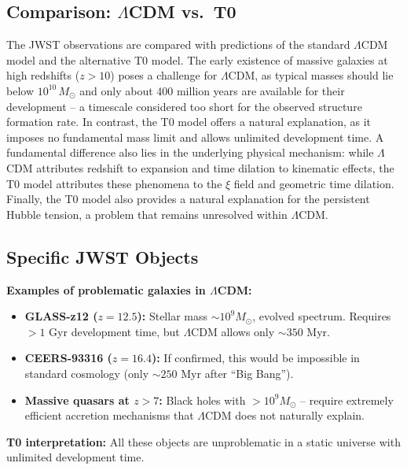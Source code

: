 \subsection{Comparison: $\Lambda$CDM vs.\ T0}

The JWST observations are compared with predictions of the standard 
$\Lambda$CDM model and the alternative T0 model. The early existence of 
massive galaxies at high redshifts ($z > 10$) poses a challenge for 
$\Lambda$CDM, as typical masses should lie below $10^{10}\,M_\odot$ and only 
about 400 million years are available for their development -- a timescale 
considered too short for the observed structure formation rate. In contrast, 
the T0 model offers a natural explanation, as it imposes no fundamental mass 
limit and allows unlimited development time. A fundamental difference also 
lies in the underlying physical mechanism: while $\Lambda$CDM attributes 
redshift to expansion and time dilation to kinematic effects, the T0 model 
attributes these phenomena to the $\xi$ field and geometric time dilation. 
Finally, the T0 model also provides a natural explanation for the persistent 
Hubble tension, a problem that remains unresolved within $\Lambda$CDM.

\subsection{Specific JWST Objects}

\textbf{Examples of problematic galaxies in $\Lambda$CDM:}

\begin{itemize}
\item \textbf{GLASS-z12 ($z=12.5$):} 
      Stellar mass $\sim 10^9 M_\odot$, evolved spectrum. 
      Requires $>1$ Gyr development time, but $\Lambda$CDM allows 
      only $\sim 350$ Myr.

\item \textbf{CEERS-93316 ($z=16.4$):} 
      If confirmed, this would be impossible in standard cosmology 
      (only $\sim 250$ Myr after ``Big Bang'').

\item \textbf{Massive quasars at $z>7$:} 
      Black holes with $>10^9 M_\odot$ -- require extremely efficient 
      accretion mechanisms that $\Lambda$CDM does not naturally explain.
\end{itemize}

\textbf{T0 interpretation:} All these objects are unproblematic in a static 
universe with unlimited development time.

